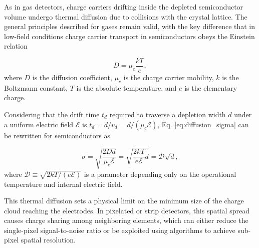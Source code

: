 As in gas detectors, charge carriers drifting inside the depleted semiconductor volume undergo thermal diffusion due to collisions with the crystal lattice. The general principles described for gases remain valid, with the key difference that in low-field conditions charge carrier transport in semiconductors obeys the Einstein relation

\begin{equation}
D = \mu_c \frac{k T}{e},
\end{equation}
where $D$ is the diffusion coefficient, $\mu_c$ is the charge carrier mobility, $k$ is the Boltzmann constant, $T$ is the absolute temperature, and $e$ is the elementary charge. 

Considering that the drift time $t_d$ required to traverse a depletion width $d$ under a uniform electric field $\mathcal{E}$ is $t_d = d / v_d = d / (\mu_c \mathcal{E})$, Eq. \ref{eq:diffusion_sigma} can be rewritten for semiconductors as

\begin{equation}
\sigma = \sqrt{\frac{2 D d}{\mu_c \mathcal{E}}} = \sqrt{\frac{2 k T}{e \mathcal{E}} d} = \mathcal{D} \sqrt{d},
\label{eq:diff_sigma_dist}
\end{equation}
where $\mathcal{D} \equiv \sqrt{2 k T / (e \mathcal{E})}$ is a parameter depending only on the operational temperature and internal electric field.

This thermal diffusion sets a physical limit on the minimum size of the charge cloud reaching the electrodes. In pixelated or strip detectors, this spatial spread causes charge sharing among neighboring elements, which can either reduce the single-pixel signal-to-noise ratio or be exploited using algorithms to achieve sub-pixel spatial resolution.
